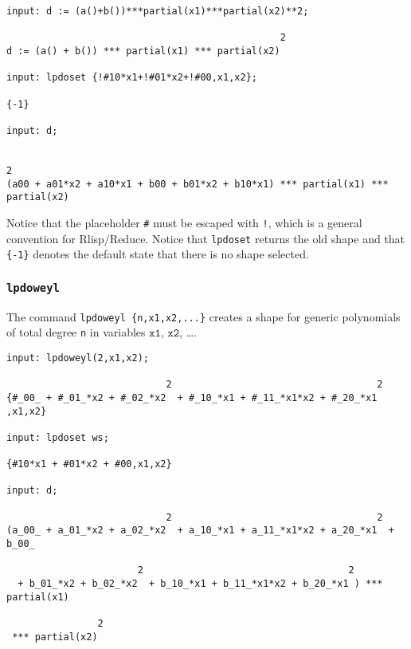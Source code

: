\begin{footnotesize}
\begin{verbatim}
input: d := (a()+b())***partial(x1)***partial(x2)**2;

                                                2
d := (a() + b()) *** partial(x1) *** partial(x2)

input: lpdoset {!#10*x1+!#01*x2+!#00,x1,x2};

{-1}

input: d;

                                                                               2
(a00 + a01*x2 + a10*x1 + b00 + b01*x2 + b10*x1) *** partial(x1) *** partial(x2)
\end{verbatim}
\end{footnotesize}
Notice that the placeholder \texttt{\#} must be escaped with
\texttt{!}, which is a general convention for Rlisp/Reduce. Notice
that \texttt{lpdoset} returns the old shape and that \texttt{\{-1\}}
denotes the default state that there is no shape selected.

\subsubsection{\texttt{lpdoweyl}}
The command \texttt{lpdoweyl \{n,x1,x2,...\}} creates a shape for
generic polynomials of total degree \texttt{n} in variables
$\texttt{x1}$, $\texttt{x2}$, \dots.

\begin{footnotesize}
\begin{verbatim}
input: lpdoweyl(2,x1,x2);

                            2                                    2
{#_00_ + #_01_*x2 + #_02_*x2  + #_10_*x1 + #_11_*x1*x2 + #_20_*x1 ,x1,x2}

input: lpdoset ws;

{#10*x1 + #01*x2 + #00,x1,x2}

input: d;

                            2                                    2
(a_00_ + a_01_*x2 + a_02_*x2  + a_10_*x1 + a_11_*x1*x2 + a_20_*x1  + b_00_

                       2                                    2
  + b_01_*x2 + b_02_*x2  + b_10_*x1 + b_11_*x1*x2 + b_20_*x1 ) *** partial(x1)

                2
 *** partial(x2)
\end{verbatim}
\end{footnotesize}

